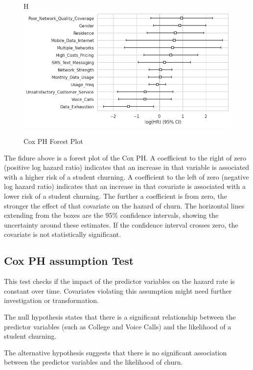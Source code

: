 \documentclass[doublespacing]{report} %
\begin{document}
\begin{figure}{H}
    \centering
    \includegraphics[width=1\linewidth]{Figure 4/4.2.png}
    \caption{Cox PH Forest Plot}
\end{figure}

The fidure above is a forest plot of the Cox PH. A coefficient to the right of zero (positive log hazard ratio) indicates that an increase in that variable is associated with a higher risk of a student churning. A coefficient to the left of zero (negative log hazard ratio) indicates that an increase in that covariate is associated with a lower risk of a student churning.
The further a coefficient is from zero, the stronger the effect of that covariate on the hazard of churn.
The horizontal lines extending from the boxes are the 95\% confidence intervals, showing the uncertainty around these estimates. If the confidence interval crosses zero, the covariate is not statistically significant.

\subsection{\textbf{Cox PH assumption Test}
}
This test checks if the impact of the predictor variables on the hazard rate is constant over time. Covariates violating this assumption might need further investigation or transformation.	

The null hypothesis states that there is a significant relationship between the predictor variables (such as College and Voice Calls) and the likelihood of a student churning.

The alternative hypothesis suggests that there is no significant association between the predictor variables and the likelihood of churn.

\end{document}
